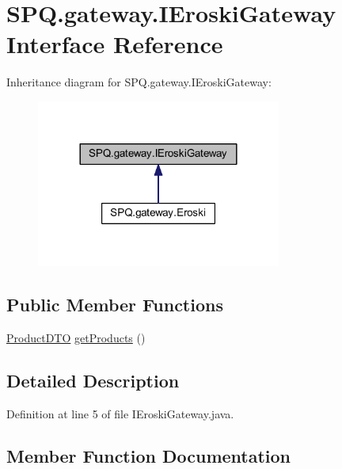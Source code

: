 \hypertarget{interface_s_p_q_1_1gateway_1_1_i_eroski_gateway}{}\section{S\+P\+Q.\+gateway.\+I\+Eroski\+Gateway Interface Reference}
\label{interface_s_p_q_1_1gateway_1_1_i_eroski_gateway}


Inheritance diagram for S\+P\+Q.\+gateway.\+I\+Eroski\+Gateway\+:\nopagebreak
\begin{figure}[H]
\begin{center}
\leavevmode
\includegraphics[width=228pt]{interface_s_p_q_1_1gateway_1_1_i_eroski_gateway__inherit__graph}
\end{center}
\end{figure}
\subsection*{Public Member Functions}
\begin{DoxyCompactItemize}
\item 
\mbox{\hyperlink{class_s_p_q_1_1dto_1_1_product_d_t_o}{Product\+D\+TO}} \mbox{\hyperlink{interface_s_p_q_1_1gateway_1_1_i_eroski_gateway_a6263f66378bc39296c6ea003642d79b9}{get\+Products}} ()
\end{DoxyCompactItemize}


\subsection{Detailed Description}


Definition at line 5 of file I\+Eroski\+Gateway.\+java.



\subsection{Member Function Documentation}
\mbox{\label{interface_s_p_q_1_1gateway_1_1_i_eroski_gateway_a6263f66378bc39296c6ea003642d79b9}} 
